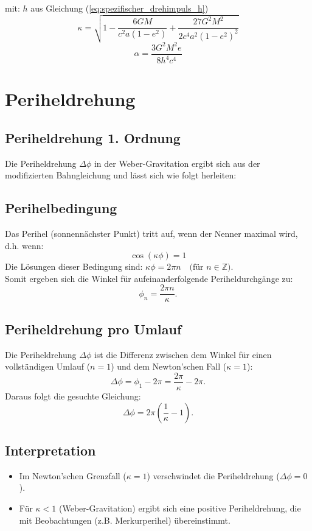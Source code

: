 mit:
$h$ aus Gleichung (\ref{eq:spezifischer_drehimpuls_h})
\begin{equation}
\label{eq:kappa_2_ordnung}
\kappa = \sqrt{1 - \frac{6GM}{c^2a(1-e^2)} + \frac{27G^2M^2}{2c^4a^2(1-e^2)^2}}
\end{equation}
\begin{equation}
\label{eq:alpha}
\alpha = \frac{3G^2M^2e}{8h^4c^4}
\end{equation}

\newpage
\section{Periheldrehung}
\subsection{Periheldrehung 1. Ordnung}
Die Periheldrehung $\Delta\phi$ in der Weber-Gravitation ergibt sich aus der modifizierten Bahngleichung und lässt sich wie folgt herleiten:

\subsection*{Perihelbedingung}
Das Perihel (sonnennächster Punkt) tritt auf, wenn der Nenner maximal wird, d.h. wenn:\\
\[\cos(\kappa\phi) = 1\]
Die Lösungen dieser Bedingung sind: $\kappa\phi = 2\pi n \quad \text{(für $n \in \mathbb{Z}$)}$.\\

Somit ergeben sich die Winkel für aufeinanderfolgende Periheldurchgänge zu:
\[
    \phi_n = \frac{2\pi n}{\kappa}.
\]

\subsection*{Periheldrehung pro Umlauf}
Die Periheldrehung $\Delta\phi$ ist die Differenz zwischen dem Winkel für einen vollständigen Umlauf ($n = 1$) und dem Newton'schen Fall ($\kappa = 1$):
\[
    \Delta\phi = \phi_1 - 2\pi = \frac{2\pi}{\kappa} - 2\pi.
\]
Daraus folgt die gesuchte Gleichung:
\begin{equation}
\boxed
{
    \Delta\phi = 2\pi\left(\frac{1}{\kappa} - 1\right)
}.
\end{equation}

\subsection*{Interpretation}
\begin{itemize}
\item Im Newton'schen Grenzfall ($\kappa = 1$) verschwindet die Periheldrehung ($\Delta\phi = 0$).
\item Für $\kappa < 1$ (Weber-Gravitation) ergibt sich eine positive Periheldrehung, die mit Beobachtungen (z.B. Merkurperihel) übereinstimmt.
\end{itemize}


